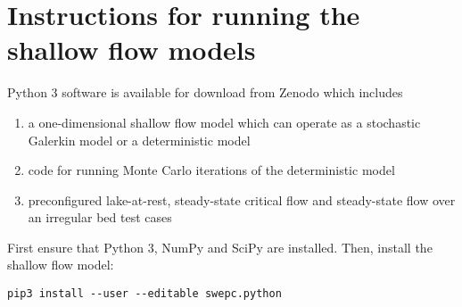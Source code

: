 \section{Instructions for running the shallow flow models}

Python 3 software is available for download from Zenodo \citep{shaw-kesserwani2019b} which includes
\begin{enumerate}
    \item a one-dimensional shallow flow model which can operate as a stochastic Galerkin model or a deterministic model
    \item code for running Monte Carlo iterations of the deterministic model
    \item preconfigured lake-at-rest, steady-state critical flow and steady-state flow over an irregular bed test cases
\end{enumerate}
First ensure that Python 3, NumPy and SciPy are installed.
Then, install the shallow flow model:
\begin{verbatim}
pip3 install --user --editable swepc.python
\end{verbatim}

